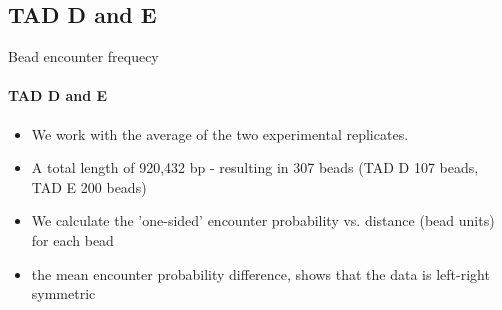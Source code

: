 \documentclass[8pt]{beamer}
\begin{document}
\subsection{TAD D and E}\label{subsection_tadDAndE}
\begin{frame}{Bead encounter frequecy}
\framesubtitle{TAD D and E}
\begin{itemize}
\item We work with the average of the two experimental replicates.
\item A total length of 920,432 bp - resulting in 307 beads (TAD D 107 beads, TAD E 200 beads)
\item We calculate the 'one-sided' encounter probability vs. distance (bead units) for each bead
\item the mean encounter probability difference, shows that the data is left-right symmetric


\end{itemize}
\end{frame}
\end{document}
